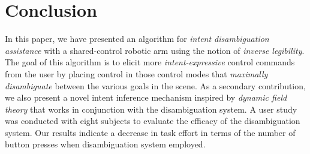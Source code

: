  
 
\section{Conclusion}\label{sec:conclusions}
In this paper, we have presented an algorithm for \textit{intent disambiguation assistance} with a shared-control robotic arm using the notion of \textit{inverse legibility}. The goal of this algorithm is to elicit more \textit{intent-expressive} control commands from the user by placing control in those control modes that \textit{maximally disambiguate} between the various goals in the scene. As a secondary contribution, we also present a novel intent inference mechanism inspired by \textit{dynamic field theory} that works in conjunction with the disambiguation system. A user study was conducted with eight subjects to evaluate the efficacy of the disambiguation system. Our results indicate a decrease in task effort in terms of the number of button presses when disambiguation system employed. 


